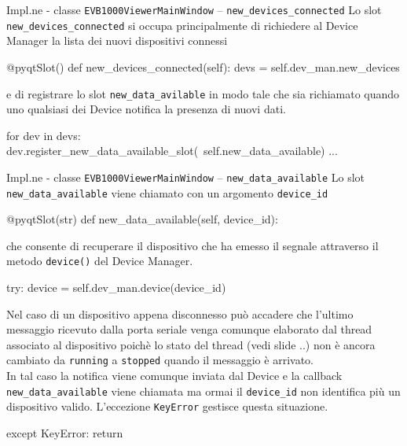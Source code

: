 \begin{frame}[fragile, shrink=10]{Impl.ne - classe \lstinline!EVB1000ViewerMainWindow! -- \lstinline!new_devices_connected!}
  Lo slot \lstinline!new_devices_connected! si occupa principalmente di richiedere al Device
  Manager la lista dei nuovi dispositivi connessi 
  \begin{Python}
    @pyqtSlot()
    def new_devices_connected(self):
        devs = self.dev_man.new_devices
  \end{Python}

  e di registrare lo slot \lstinline!new_data_avilable! in modo tale che sia richiamato
  quando uno qualsiasi dei Device notifica la presenza di nuovi dati.
  \begin{Python}
        for dev in devs:
            dev.register_new_data_available_slot(\
                self.new_data_available)
        ...    
  \end{Python}
\end{frame}


\begin{frame}[fragile, shrink=30]{Impl.ne - classe \lstinline!EVB1000ViewerMainWindow! -- \lstinline!new_data_available!}
  Lo slot \lstinline!new_data_available! viene chiamato con un argomento \lstinline!device_id!
  \begin{Python}
    @pyqtSlot(str)
    def new_data_available(self, device_id):
  \end{Python}

  che consente di recuperare il dispositivo che ha emesso il segnale attraverso il metodo
  \lstinline!device()! del Device Manager.
  \begin{Python}
        try:
            device = self.dev_man.device(device_id)
  \end{Python}

  Nel caso di un dispositivo appena disconnesso può accadere che l'ultimo
  messaggio ricevuto dalla porta seriale venga comunque elaborato dal thread
  associato al dispositivo poichè lo stato del thread (vedi slide ..) non è ancora
  cambiato da \lstinline!running! a \lstinline!stopped! quando il messaggio è arrivato.\\
  In tal caso la notifica viene comunque inviata dal Device e la callback \lstinline!new_data_available!
  viene chiamata ma ormai il \lstinline!device_id! non identifica più un dispositivo valido.
  L'eccezione \lstinline!KeyError! gestisce questa situazione.
  \begin{Python}
        except KeyError:
            return

  \end{Python}
\end{frame}


